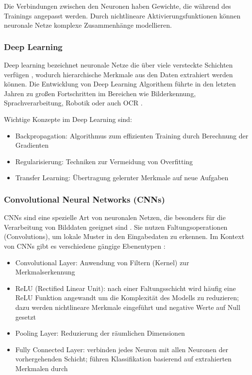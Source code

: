 Die Verbindungen zwischen den Neuronen haben Gewichte, die während des Trainings angepasst werden. Durch nichtlineare Aktivierungsfunktionen können neuronale Netze komplexe Zusammenhänge modellieren.

\subsubsection{Deep Learning}
\label{subsec:deep-learning}
Deep learning bezeichnet neuronale Netze die über viele versteckte Schichten verfügen \cite{RebalaGopinath2019AItM}, wodurch hierarchische Merkmale aus den Daten extrahiert werden können. Die Entwicklung von Deep Learning Algorithem führte in den letzten Jahren zu großen Fortschritten im Bereichen wie Bilderkennung, Sprachverarbeitung, Robotik oder auch \gls{OCR} \cite{jordan2015machine}.

Wichtige Konzepte im Deep Learning sind:
\begin{itemize}
	\item Backpropagation: Algorithmus zum effizienten Training durch Berechnung der Gradienten \cite{RebalaGopinath2019AItM}
	\item Regularisierung: Techniken zur Vermeidung von Overfitting \cite{jordan2015machine}
	\item Transfer Learning: Übertragung gelernter Merkmale auf neue Aufgaben \cite{jordan2015machine}
\end{itemize}


\subsubsection{Convolutional Neural Networks (CNNs)}
\label{subsubsec:cnn}
CNNs sind eine spezielle Art von neuronalen Netzen, die besonders für die Verarbeitung von Bilddaten geeignet sind \cite{RebalaGopinath2019AItM}. Sie nutzen Faltungsoperationen (Convolutions), um lokale Muster in den Eingabedaten zu erkennen. Im Kontext von \glspl{CNN} gibt es verschiedene gängige Ebenentypen \cite{RebalaGopinath2019AItM}:

\begin{itemize}
	\item Convolutional Layer: Anwendung von Filtern (Kernel) zur Merkmalserkennung
	\item ReLU (Rectified Linear Unit): nach einer Faltungsschicht wird häufig eine ReLU Funktion angewandt um die Komplexität des Modells zu reduzieren; dazu werden nichtlineare Merkmale eingeführt und negative Werte auf Null gesetzt
	\item Pooling Layer: Reduzierung der räumlichen Dimensionen
	\item Fully Connected Layer: verbinden jedes Neuron mit allen Neuronen der vorhergehenden Schicht; führen Klassifikation basierend auf extrahierten Merkmalen durch
\end{itemize}

